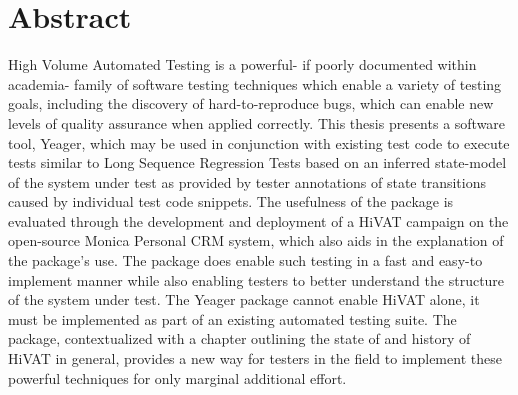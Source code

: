 \doublespacing
\chapter*{Abstract}
\abstract{}
 High Volume Automated Testing is a powerful- if poorly documented within academia- family of software testing techniques which enable a variety of testing goals, including the discovery of hard-to-reproduce bugs, which can enable new levels of quality assurance when applied correctly. This thesis presents a software tool, Yeager, which may be used in conjunction with existing test code to execute tests similar to Long Sequence Regression Tests based on an inferred state-model of the system under test as provided by tester annotations of state transitions caused by individual test code snippets. The usefulness of the package is evaluated through the development and deployment of a HiVAT campaign on the open-source Monica Personal CRM system, which also aids in the explanation of the package's use. The package does enable such testing in a fast and easy-to implement manner while also enabling testers to better understand the structure of the system under test. The Yeager package cannot enable HiVAT alone, it must be implemented as part of an existing automated testing suite. The package, contextualized with a chapter outlining the state of and history of HiVAT in general, provides a new way for testers in the field to implement these powerful techniques for only marginal additional effort.
